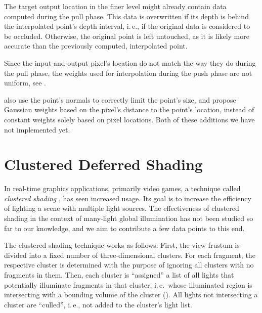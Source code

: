 The target output location in the finer level might already contain data computed during the pull phase. This data is overwritten if its depth is behind the interpolated point's depth interval, i.\,e., if the original data is considered to be occluded. Otherwise, the original point is left untouched, as it is likely more accurate than the previously computed, interpolated point.

Since the input and output pixel's location do not match the way they do during the pull phase, the weights used for interpolation during the push phase are not uniform, see .

 \citet{Marroquim:2007:reconstruction} also use the point's normals to correctly limit the point's size, and \citet{Marroquim:2008:reconstruction2} propose Gaussian weights based on the pixel's distance to the point's location, instead of constant weights solely based on pixel locations. Both of these additions we have not implemented yet.



\section{Clustered Deferred Shading}
\label{sec:concept:clusteredShading}

In real-time graphics applications, primarily video games, a technique called \textit{clustered shading} \citep{olsson2012clustered}, has seen increased usage. Its goal is to increase the efficiency of lighting a scene with multiple light sources.
The effectiveness of clustered shading in the context of many-light global illumination has not been studied so far to our knowledge, and we aim to contribute a few data points to this end.

The clustered shading technique works as follows: First, the view frustum is divided into a fixed number of three-dimensional clusters. For each fragment, the respective cluster is determined with the purpose of ignoring all clusters with no fragments in them. Then, each cluster is ``assigned'' a list of all lights that potentially illuminate fragments in that cluster, i.\,e.\, whose illuminated region is intersecting with a bounding volume of the cluster (). All lights not intersecting a cluster are ``culled'', i.\,e., not added to the cluster's light list.

